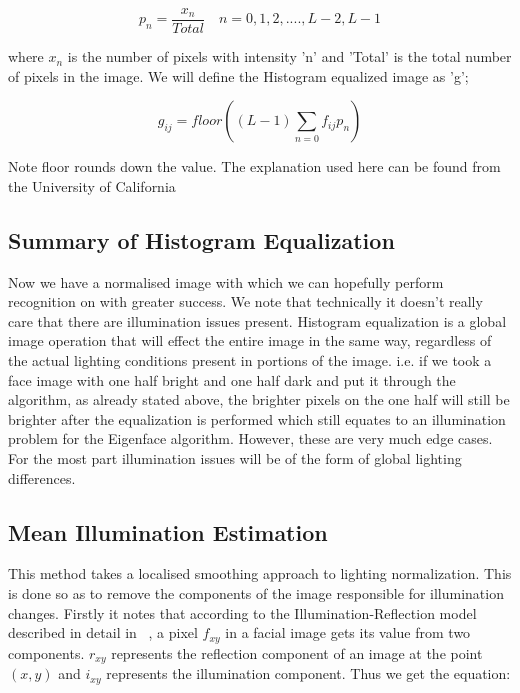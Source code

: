 	\begin{equation}
		p_{n} = \frac{x_n}{Total} \quad n = 0,1,2,....,L-2, L-1
	\end{equation}
	
where $x_n$ is the number of pixels with intensity 'n' and 'Total' is the total number 
of pixels in the image.  We will define the Histogram equalized image as 'g';

	\begin{equation}
		g_{ij} = floor((L-1)\sum_{n=0}{f_{ij}} p_n )
	\end{equation}
	
Note floor rounds down the value.  The explanation used here can be found from the University of California 
~\cite{urlHistEqualization}

\subsection{Summary of Histogram Equalization}
Now we have a normalised image with which we can hopefully perform recognition on with greater success.  We note that technically 
it doesn't really care that there are illumination issues present.  Histogram equalization is a global image operation that will 
effect the entire image in the same way, regardless of the actual lighting conditions present in portions of the image.  i.e. if we 
took a face image with one half bright and one half dark and put it through the algorithm, as already stated above, the brighter 
pixels on the one half will still be brighter after the equalization is performed which still equates to an illumination problem 
for the Eigenface algorithm.  However, these are very much edge cases.  For the most part illumination issues will be of the form 
of global lighting differences.


\subsection{Mean Illumination Estimation}
	This method takes a localised smoothing approach to lighting normalization.  This is done so as to remove the components of 
	the image responsible for illumination changes.  Firstly it notes that according to the Illumination-Reflection model described 
	in detail in ~\cite{JianSaCSiIaSRCTaA}, a pixel $f_{xy}$ in a facial image gets its value from two components. $r_{xy}$ 
	represents the reflection component of an image at the point $(x,y)$ and $i_{xy}$ represents the illumination component.  Thus 
	we get the equation:
		
